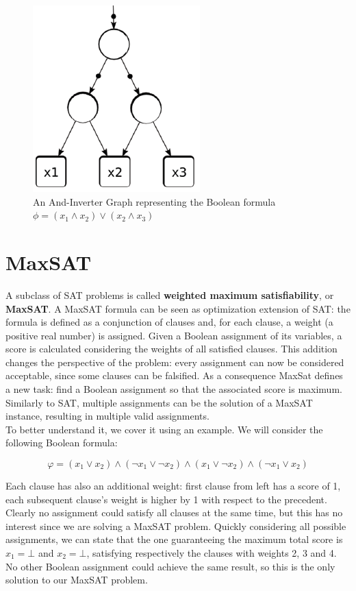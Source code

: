 \begin{figure}[t]
	\begin{center}
	\includegraphics{images/AIG.png}
	\caption{An And-Inverter Graph representing the Boolean formula $\phi = (x_1 \wedge x_2) \vee (x_2 \wedge x_3)$}
	\end{center}
\end{figure}



\section{MaxSAT}
A subclass of SAT problems is called \textbf{weighted maximum satisfiability}, or \textbf{MaxSAT}. A MaxSAT formula can be seen as optimization extension of SAT: the formula is defined as a conjunction of clauses and, for each clause, a weight (a positive real number) is assigned. Given a Boolean assignment of its variables, a score is calculated considering the weights of all satisfied clauses. This addition changes the perspective of the problem: every assignment can now be considered acceptable, since some clauses can be falsified. As a consequence MaxSat defines a new task: find a Boolean assignment so that the associated score is maximum. Similarly to SAT, multiple assignments can be the solution of a MaxSAT instance, resulting in multiple valid assignments. \\
To better understand it, we cover it using an example. We will consider the following Boolean formula:

\begin{equation}
    \varphi = ( x_1 \vee x_2) \wedge (\neg x_1 \vee \neg x_2) \wedge ( x_1 \vee \neg x_2) \wedge (\neg x_1 \vee x_2)
\end{equation}

Each clause has also an additional weight: first clause from left has a score of 1, each subsequent clause's weight is higher by 1 with respect to the precedent. Clearly no assignment could satisfy all clauses at the same time, but this has no interest since we are solving a MaxSAT problem. Quickly considering all possible assignments, we can state that the one guaranteeing the maximum total score is $x_1 = \bot$ and $x_2 = \bot$, satisfying respectively the clauses with weights 2, 3 and 4. No other Boolean assignment could achieve the same result, so this is the only solution to our MaxSAT problem.


